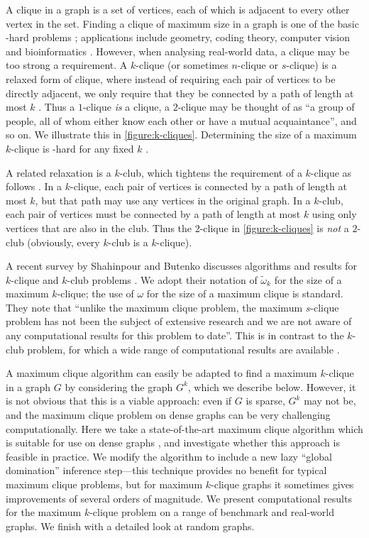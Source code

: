 \documentclass[letterpaper]{article}
\begin{document}
A clique in a graph is a set of vertices, each of which is adjacent to every other vertex in the
set. Finding a clique of maximum size in a graph is one of the basic \NP-hard
problems \cite{Garey:1990}; applications include geometry, coding theory, computer vision and
bioinformatics \cite{Bomze:1999,Butenko:2006}. However, when analysing real-world data, a clique may
be too strong a requirement. A $k$-clique (or sometimes $n$-clique or $s$-clique) is a relaxed form
of clique, where instead of requiring each pair of vertices to be directly adjacent, we only require
that they be connected by a path of length at most $k$ \cite{Luce:1950}. Thus a $1$-clique \emph{is} a
clique, a $2$-clique may be thought of as ``a group of people, all of whom either know each other or
have a mutual acquaintance'', and so on. We illustrate this in \cref{figure:k-cliques}.
Determining the size of a maximum $k$-clique is \NP-hard for any fixed $k$ \cite{Bourjolly:2002}.

A related relaxation is a $k$-club, which tightens the requirement of a $k$-clique as follows
\cite{Mokken:1979}. In a $k$-clique, each pair of vertices is connected by a path of length at most
$k$, but that path may use any vertices in the original graph. In a $k$-club, each pair of vertices
must be connected by a path of length at most $k$ using only vertices that are also in the club.
Thus the $2$-clique in \cref{figure:k-cliques} is \emph{not} a $2$-club (obviously, every $k$-club
is a $k$-clique).

A recent survey by Shahinpour and Butenko discusses algorithms and results for $k$-clique and
$k$-club problems \cite{Shahinpour:2013}.  We adopt their notation of $\tilde{\omega}_k$ for the
size of a maximum $k$-clique; the use of $\omega$ for the size of a maximum clique is standard.
They note that ``unlike the maximum clique problem, the maximum $s$-clique problem has not been the
subject of extensive research and we are not aware of any computational results for this problem to
date''. This is in contrast to the $k$-club problem, for which a wide range of computational results
are available
\cite{Bourjolly:2000,Bourjolly:2002,Mahdavi:2012,Hartung:2012,Chang:2013,Shahinpour:2013,Wotzlaw:2014}.

A maximum clique algorithm can easily be adapted to find a maximum $k$-clique in a graph $G$ by
considering the graph $G^k$, which we describe below. However, it is not obvious that this is a
viable approach: even if $G$ is sparse, $G^k$ may not be, and the maximum clique problem on dense
graphs can be very challenging computationally. Here we take a state-of-the-art maximum clique
algorithm which is suitable for use on dense graphs \cite{Prosser:2012,McCreesh:2013}, and
investigate whether this approach is feasible in practice. We modify the algorithm to include a new
lazy ``global domination'' inference step---this technique provides no benefit for typical maximum
clique problems, but for maximum $k$-clique graphs it sometimes gives improvements of several orders
of magnitude. We present computational results for the maximum $k$-clique problem on a range of
benchmark and real-world graphs. We finish with a detailed look at random graphs.
\end{document}
